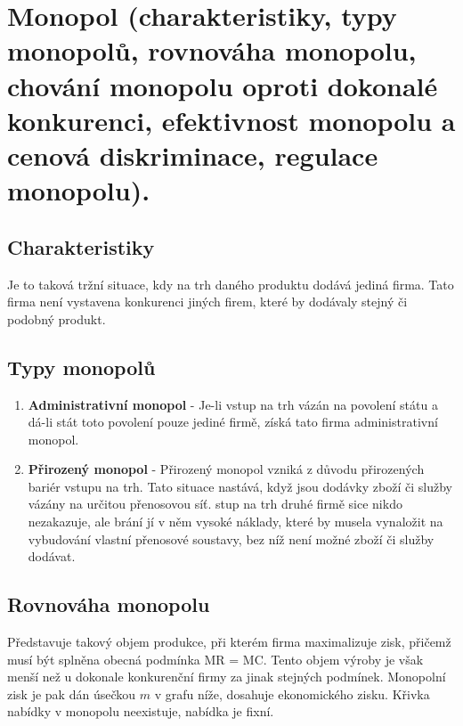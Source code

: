 \clearpage
\section{Monopol (charakteristiky, typy monopolů, rovnováha monopolu, chování monopolu
oproti dokonalé konkurenci, efektivnost monopolu a cenová diskriminace, regulace
monopolu).}

\subsection{Charakteristiky}
Je to taková tržní situace, kdy na trh daného produktu dodává jediná firma. Tato
firma není vystavena konkurenci jiných firem, které by dodávaly stejný či podobný produkt.

\subsection{Typy monopolů}
\begin{enumerate}
    \item \textbf{Administrativní monopol} - Je-li vstup na trh vázán na povolení státu a dá-li stát 
    toto povolení pouze jediné firmě, získá tato firma administrativní monopol.
    \item \textbf{Přirozený monopol} - Přirozený monopol vzniká z důvodu přirozených bariér vstupu na trh.
    Tato situace nastává, když jsou dodávky zboží či služby vázány na určitou přenosovou síť. 
    stup na trh druhé firmě sice nikdo nezakazuje, ale brání jí v něm vysoké náklady, které by 
    musela vynaložit na vybudování vlastní přenosové soustavy, bez níž není možné zboží či služby dodávat.
\end{enumerate}

\subsection{Rovnováha monopolu}
Představuje takový objem produkce, při kterém firma maximalizuje zisk, přičemž musí být splněna
obecná podmínka MR = MC. Tento objem výroby je však menší než u dokonale konkurenční firmy 
za jinak stejných podmínek. Monopolní zisk je pak dán úsečkou $m$ v grafu níže, dosahuje ekonomického zisku.
Křivka nabídky v monopolu neexistuje, nabídka je fixní.


